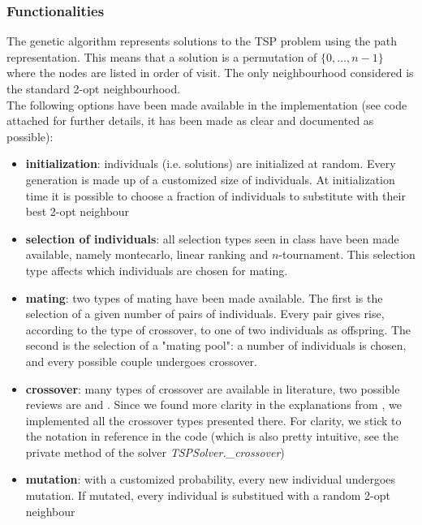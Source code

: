 \documentclass{article}
\begin{document}
\subsubsection{Functionalities}
The genetic algorithm represents solutions to the TSP problem using the path representation. This means that a solution is a permutation of $\{0, \ldots, n-1\}$ where the nodes are listed in order of visit. The only neighbourhood considered is the standard 2-opt neighbourhood. \\
The following options have been made available in the implementation (see code attached for further details, it has been made as clear and documented as possible):
\begin{itemize}
\item \textbf{initialization}: individuals (i.e. solutions) are initialized at random. Every generation is made up of a customized size of individuals. At initialization time it is possible to choose a fraction of individuals to substitute with their best 2-opt neighbour

\item \textbf{selection of individuals}: all selection types seen in class have been made available, namely montecarlo, linear ranking and $n$-tournament. This selection type affects which individuals are chosen for mating.

\item \textbf{mating}: two types of mating have been made available. The first is the selection of a given number of pairs of individuals. Every pair gives rise, according to the type of crossover, to one of two individuals as offspring. The second is the selection of a "mating pool": a number of individuals is chosen, and every possible couple undergoes crossover.

\item \textbf{crossover}: many types of crossover are available in literature, two possible reviews are \cite{gupta2011study} and \cite{abdoun2012comparative}. Since we found more clarity in the explanations from \cite{gupta2011study}, we implemented all the crossover types presented there. For clarity, we stick to the notation in reference in the code (which is also pretty intuitive, see the private method of the solver \textit{TSPSolver.\_crossover})

\item \textbf{mutation}: with a customized probability, every new individual undergoes mutation. If mutated, every individual is substitued with a random 2-opt neighbour


\end{itemize}
\end{document}
